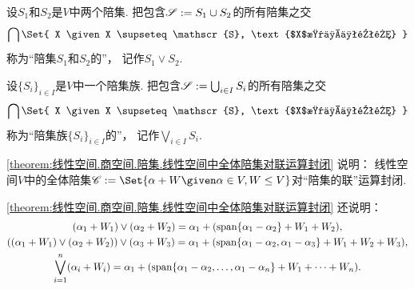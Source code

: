 \begin{definition}
设\(S_1\)和\(S_2\)是\(V\)中两个陪集.
把包含\(\mathscr{S} := S_1 \cup S_2\)的所有陪集之交\begin{equation*}
	\bigcap\Set{
		X
		\given
		X \supseteq \mathscr{S},
		\text{$X$是一个陪集}
	}
\end{equation*}
称为“陪集\(S_1\)和\(S_2\)的”，
记作\(S_1 \vee S_2\).
\end{definition}

\begin{definition}
设\(\{S_i\}_{i \in I}\)是\(V\)中一个陪集族.
把包含\(\mathscr{S} := \bigcup_{i \in I} S_i\)的所有陪集之交\begin{equation*}
	\bigcap\Set{
		X
		\given
		X \supseteq \mathscr{S},
		\text{$X$是一个陪集}
	}
\end{equation*}
称为“陪集族\(\{S_i\}_{i \in I}\)的”，
记作\(\bigvee_{i \in I} S_i\).
\end{definition}

\cref{theorem:线性空间.商空间.陪集.线性空间中全体陪集对联运算封闭} 说明：
线性空间\(V\)中的全体陪集\(
	\mathscr{C}
	\defeq
	\Set{
		\alpha + W
		\given
		\alpha \in V,
		W \leq V
	}
\)对“陪集的联”运算封闭.

\cref{theorem:线性空间.商空间.陪集.线性空间中全体陪集对联运算封闭} 还说明：\begin{gather*}
	(\alpha_1 + W_1) \vee (\alpha_2 + W_2)
	= \alpha_1 + (\operatorname{span}\{\alpha_1 - \alpha_2\} + W_1 + W_2), \\
	((\alpha_1 + W_1) \vee (\alpha_2 + W_2)) \vee (\alpha_3 + W_3)
	= \alpha_1 + (\operatorname{span}\{\alpha_1 - \alpha_2,\alpha_1 - \alpha_3\} + W_1 + W_2 + W_3), \\
	\bigvee_{i=1}^n (\alpha_i + W_i)
	= \alpha_1 + (\operatorname{span}\{\alpha_1 - \alpha_2,\dotsc,\alpha_1 - \alpha_n\} + W_1 + \dotsb + W_n).
\end{gather*}


